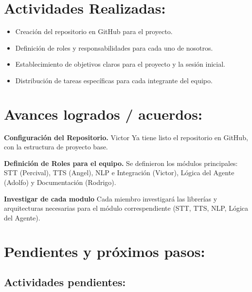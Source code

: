\documentclass[a4paper,12pt]{article}
\begin{document}
\section{Actividades Realizadas:}
\begin{itemize}
    \item Creación del repositorio en GitHub para el proyecto.
    \item Definición de roles y responsabilidades para cada uno de nosotros.
    \item Establecimiento de objetivos claros para el proyecto y la sesión inicial.
    \item Distribución de tareas específicas para cada integrante del equipo.
\end{itemize}

\section{Avances logrados / acuerdos:}

\begin{description}
        \item\textbf{Configuración del Repositorio.} Victor Ya tiene listo el repositorio en GitHub, con la estructura de proyecto base.
        \item \textbf{Definición de Roles para el equipo.} Se definieron los módulos principales: STT (Percival), TTS (Angel), NLP e Integración (Victor), Lógica del Agente (Adolfo) y Documentación (Rodrigo).
        \item \textbf{Investigar de cada modulo} Cada miembro investigará las librerías y arquitecturas necesarias para el módulo correspendiente (STT, TTS, NLP, Lógica del Agente).
\end{description}


\section{Pendientes y próximos pasos:}

\subsection{Actividades pendientes:}
\end{document}
